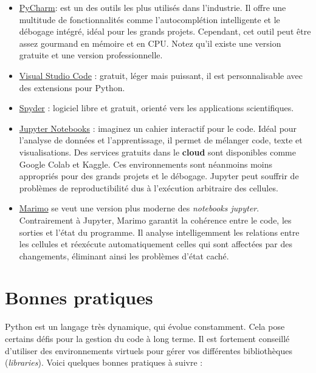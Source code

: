 \documentclass[
  11pt,
  letterpaper,
  open=any,
  twoside=false,
  french]{scrbook}
\begin{document}
\begin{itemize}
\item
  \href{https://www.jetbrains.com/pycharm/}{PyCharm}: est un des outils
  les plus utilisés dans l'industrie. Il offre une multitude de
  fonctionnalités comme l'autocomplétion intelligente et le débogage
  intégré, idéal pour les grands projets. Cependant, cet outil peut être
  assez gourmand en mémoire et en CPU. Notez qu'il existe une version
  gratuite et une version professionnelle.
\item
  \href{https://code.visualstudio.com/}{Visual Studio Code} : gratuit,
  léger mais puissant, il est personnalisable avec des extensions pour
  Python.
\item
  \href{https://www.spyder-ide.org/}{Spyder} : logiciel libre et
  gratuit, orienté vers les applications scientifiques.
\item
  \href{https://jupyter.org/}{Jupyter Notebooks} : imaginez un cahier
  interactif pour le code. Idéal pour l'analyse de données et
  l'apprentissage, il permet de mélanger code, texte et visualisations.
  Des services gratuits dans le \textbf{cloud} sont disponibles comme
  Google Colab et Kaggle. Ces environnements sont néanmoins moins
  appropriés pour des grands projets et le débogage. Jupyter peut
  souffrir de problèmes de reproductibilité dus à l'exécution arbitraire
  des cellules.
\item
  \href{https://marimo.io/}{Marimo} se veut une version plus moderne des
  \emph{notebooks jupyter}. Contrairement à Jupyter, Marimo garantit la
  cohérence entre le code, les sorties et l'état du programme. Il
  analyse intelligemment les relations entre les cellules et réexécute
  automatiquement celles qui sont affectées par des changements,
  éliminant ainsi les problèmes d'état caché.
\end{itemize}

\section{Bonnes pratiques}\label{bonnes-pratiques}

Python est un langage très dynamique, qui évolue constamment. Cela pose
certains défis pour la gestion du code à long terme. Il est fortement
conseillé d'utiliser des environnements virtuels pour gérer vos
différentes bibliothèques (\emph{libraries}). Voici quelques bonnes
pratiques à suivre :
\end{document}
